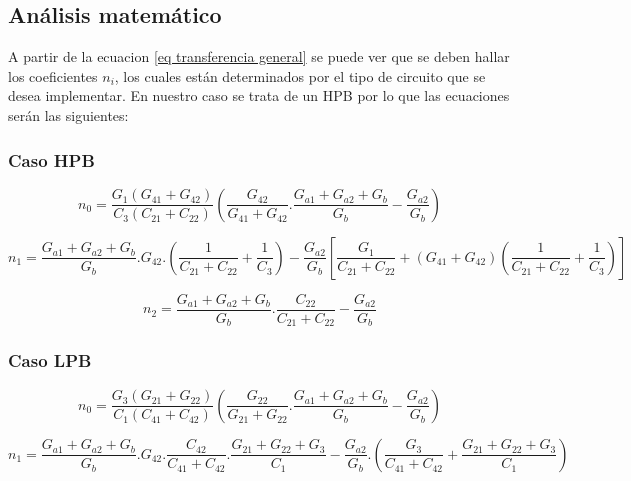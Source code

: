 \subsection{Análisis matemático}

A partir de la ecuacion \ref{eq transferencia general} se puede ver que se deben hallar los coeficientes $n_i$, los cuales están determinados por el tipo de circuito que se desea implementar. En nuestro caso se trata de un HPB por lo que las ecuaciones serán las siguientes:

\subsubsection*{Caso HPB}
\begin{equation}
	n_0= \frac{G_1(G_{41}+G_{42} )}{C_3 ( C_{21} + C_{22} )} \left( \frac{G_{42}}{G_{41}+G_{42}} . \frac{G_{a1}+G_{a2}+G_{b}}{G_b} - \frac{G_{a2}}{G_b} \right)
	\label{coef n0 HPB}
\end{equation}

\begin{equation}
	n_1 = \frac{G_{a1}+G_{a2}+G_b}{G_b} . G_{42}. \left( \frac{1}{C_{21} + C_{22}} + \frac{1}{C_3} \right) - \frac{G_{a2}}{G_b} \left[ \frac{G_1}{C_{21} + C_{22}} + (G_{41}+G_{42}) \left( \frac{1}{C_{21} + C_{22}} + \frac{1}{C_3} \right) \right]
	\label{coef n1 HPB}
\end{equation}

\begin{equation}
	n_2 = \frac{G_{a1}+G_{a2}+G_b}{G_b} . \frac{C_{22}}{C_{21} + C_{22}} - \frac{G_{a2}}{G_b}
	\label{coef n2 HPB}
\end{equation}


\subsubsection*{Caso LPB}

\begin{equation}
	n_0= \frac{G_3(G_{21}+G_{22} )}{C_1 ( C_{41} + C_{42} )} \left( \frac{G_{22}}{G_{21}+G_{22}} . \frac{G_{a1}+G_{a2}+G_{b}}{G_b} - \frac{G_{a2}}{G_b} \right)
	\label{coef n0 LPB}
\end{equation}

\begin{equation}
	n_1 = \frac{G_{a1}+G_{a2}+G_b}{G_b}. G_{42}. \frac{C_{42}}{C_{41}+C_{42}} . \frac{G_{21} + G_{22} + G_3}{C_1} - \frac{G_{a2}}{G_b} . \left( \frac{G_3}{C_{41} + C_{42}} + \frac{G_{21}+G_{22} + G_3}{C_1}\right)
	\label{coef n1 LPB}
\end{equation}


